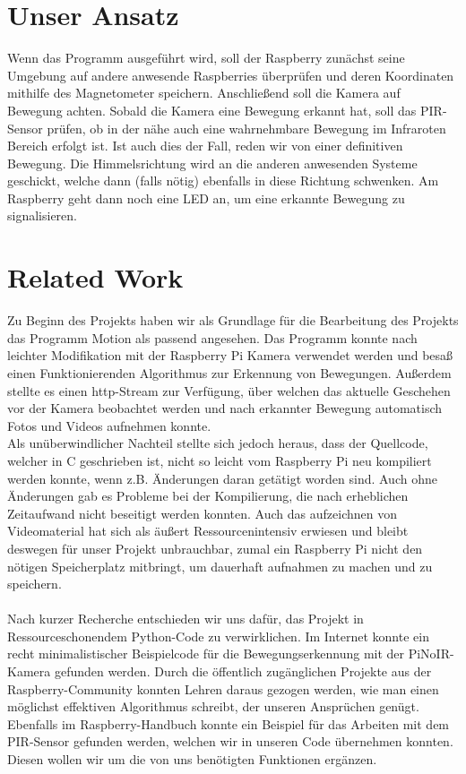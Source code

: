 \documentclass[journal]{IEEEtran}
\begin{document}
\section{Unser Ansatz} 
Wenn das Programm ausgeführt wird, soll der Raspberry zunächst seine Umgebung auf andere anwesende Raspberries überprüfen und deren Koordinaten mithilfe des Magnetometer speichern.  Anschließend soll die Kamera auf Bewegung achten. Sobald die Kamera eine Bewegung erkannt hat, soll das PIR-Sensor prüfen, ob in der nähe auch eine wahrnehmbare Bewegung im Infraroten Bereich erfolgt ist. Ist auch dies der Fall, reden wir von einer definitiven Bewegung. Die Himmelsrichtung wird an die anderen anwesenden Systeme geschickt, welche dann (falls nötig) ebenfalls in diese Richtung schwenken.  Am Raspberry geht dann noch eine LED an, um eine erkannte Bewegung zu signalisieren. 


\section{Related Work} 
Zu Beginn des Projekts haben wir als Grundlage für die Bearbeitung des Projekts das Programm Motion\cite{motion} als passend angesehen. Das Programm konnte nach leichter Modifikation mit der Raspberry Pi Kamera verwendet werden und besaß einen Funktionierenden Algorithmus zur Erkennung von Bewegungen. Außerdem stellte es einen http-Stream zur Verfügung, über welchen das aktuelle Geschehen vor der Kamera beobachtet werden und nach erkannter Bewegung automatisch Fotos und Videos aufnehmen konnte. \\ Als unüberwindlicher Nachteil stellte sich jedoch heraus, dass der Quellcode, welcher in C geschrieben ist, nicht so leicht vom Raspberry Pi neu kompiliert werden konnte, wenn z.B. Änderungen daran getätigt worden sind. Auch ohne Änderungen gab es Probleme bei der Kompilierung, die nach erheblichen Zeitaufwand nicht beseitigt werden konnten. Auch das aufzeichnen von Videomaterial hat sich als äußert Ressourcenintensiv erwiesen und bleibt deswegen für unser Projekt unbrauchbar, zumal ein Raspberry Pi nicht den nötigen Speicherplatz mitbringt, um dauerhaft aufnahmen zu machen und zu speichern.\\ \\Nach kurzer Recherche entschieden wir uns dafür, das Projekt in Ressourceschonendem Python-Code zu verwirklichen. Im Internet konnte ein recht minimalistischer Beispielcode für die Bewegungserkennung mit der PiNoIR-Kamera gefunden werden\cite{motioncode}. Durch die öffentlich zugänglichen Projekte aus der Raspberry-Community konnten Lehren daraus gezogen werden, wie man einen möglichst effektiven Algorithmus schreibt, der unseren Ansprüchen genügt. Ebenfalls im Raspberry-Handbuch konnte ein Beispiel für das Arbeiten mit dem PIR-Sensor gefunden werden\cite[S. 495]{Raspi}, welchen wir in unseren Code übernehmen konnten. Diesen wollen wir um die von uns benötigten Funktionen ergänzen.
\end{document}
